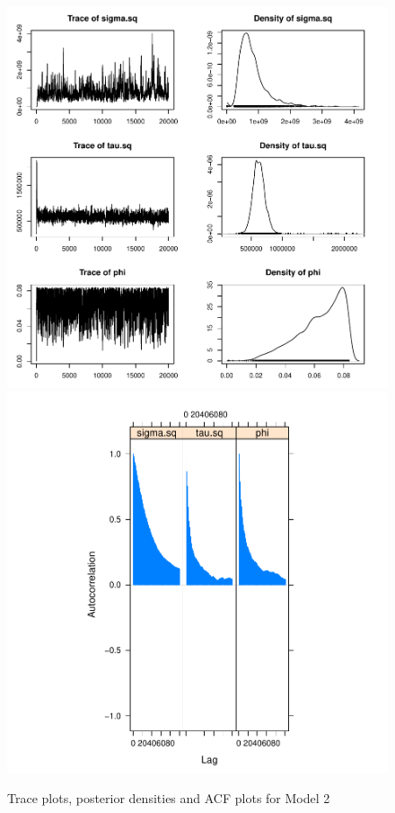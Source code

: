 \documentclass[12pt]{article}
\begin{document}
	\begin{figure}[H]
		\centering
		\includegraphics[scale=0.55]{Plots_North+South/v2_both.pdf}
		\includegraphics[scale=0.55]{Plots_North+South/v2_both_acf.pdf}
		\caption{Trace plots, posterior densities and ACF plots for Model 2}
	\end{figure}
	
\end{document}

